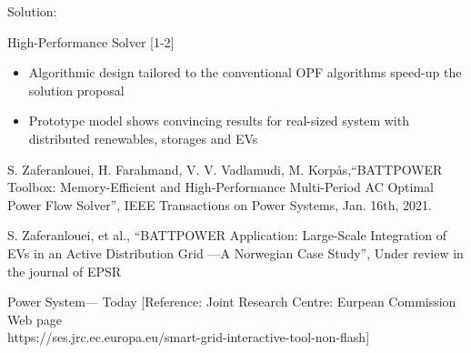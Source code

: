 \documentclass{beamer}
\begin{document}
\begin{frame}{Solution:}
\begin{block}{High-Performance Solver [1-2]}
\begin{itemize}
\item<1-> Algorithmic design tailored to the conventional OPF algorithms speed-up the solution proposal
\item<1-> Prototype model shows convincing results for real-sized system with distributed renewables, storages and EVs

\end{itemize}
\end{block}

\begin{enumerate}
{\tiny 
\item S. Zaferanlouei, H. Farahmand, V. V. Vadlamudi, M. Korpås,“BATTPOWER Toolbox: Memory-Efficient and High-Performance Multi-Period AC Optimal Power Flow Solver”, IEEE Transactions on Power Systems, Jan. 16th, 2021.
\item S. Zaferanlouei, et al., “BATTPOWER Application: Large-Scale Integration of EVs in an Active Distribution Grid ---A Norwegian Case Study”, Under review in the journal of EPSR}
 \end{enumerate}
\end{frame}
\begin{frame}{Power System--- Today}
\centering
{}
{\tiny[Reference: Joint Research Centre: Eurpean Commission Web page\\
https://ses.jrc.ec.europa.eu/smart-grid-interactive-tool-non-flash]}
\end{frame}
\end{document}
